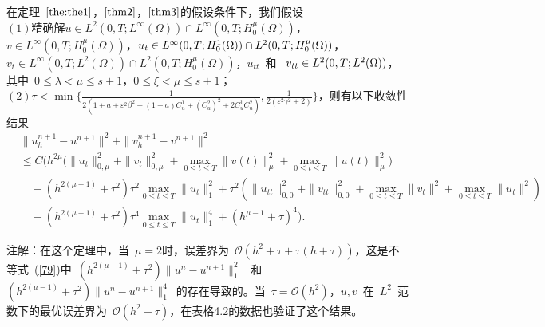 \documentclass[twoside,UTF8]{nputhesis}
\begin{document}
\begin{theorem}
	[收敛性~II]
	在定理~$\ref{the:the1}$，$\ref{thm2}$，$\ref{thm3}$的假设条件下，我们假设\\
	$(1)$\quad 精确解$u\in L^2(0,T;L^\infty(\Omega))\cap L^{\infty}(0,T;H^\mu_0(\Omega))$，$v\in L^{\infty}(0,T;H^\mu_0(\Omega))$，$u_t\in L^\infty(0,\\T;H^1_0(\Omega))\cap L^2(0,T;H^\mu_0(\Omega))$，$v_t\in L^\infty(0,T;L^2(\Omega))\cap L^2(0,T;H^\mu_0(\Omega))$，$u_{tt}$~和 ~$v_{tt}\in L^2(0,\\T;L^2(\Omega))$，其中~$0\leq\lambda<\mu\leq {s+1}$，$0\leq\xi<\mu\leq {s+1}$；\\
	$(2)$\quad $\tau<\min\{\frac{1}{2(1+a+\varepsilon^2\beta^2+(1+a)C_u^1+(C_u^2)^2+2C_u^1C_u^2)},\frac{1}{2(\varepsilon^2\gamma^2+2)}\}$，则有以下收敛性结果
	\begin{equation*}
	\begin{split}
	&\|u^{n+1}_h-u^{n+1}\|^2+\| v^{n+1}_h-v^{n+1}\|^2\\
	&\leq C\Big(h^{2\mu}\big( \| u_t\|^2_{0,\mu}+\| v_t\|^2_{0,\mu}+\max_{0\leq t\leq T}\| v(t)\|^2_\mu+\max_{0\leq t\leq T}\| u(t)\|^2_{\mu}\big)\\
	&\quad+(h^{2(\mu-1)}+\tau^2)\tau^2\max_{0\leq t\leq T}\| u_t\|^2_1+\tau^2(\| u_{tt}\|^2_{0,0}+\| v_{tt}\|^2_{0,0}+\max_{0\leq t\leq T}\| v_t\|^2+\max_{0\leq t\leq T}\| u_t\|^2)\\
	&\quad+(h^{2(\mu-1)}+\tau^2)\tau^4\max_{0\leq t\leq T}\| u_t\|^4_1+(h^{\mu-1}+\tau)^4\Big).
	\end{split}
	\label{ending}
	\end{equation*}
	\label{the:the3}
\end{theorem}
注解：在这个定理中，当~$\mu=2$时，误差界为~$\mathcal {O}(h^2+\tau+\tau(h+\tau))$，这是不等式~(\ref{79})中~$(h^{2(\mu-1)}\!+\!\tau^2)\parallel u^n-u^{n+1}\parallel^2_1$~ 和~$(h^{2(\mu-1)}\!+\!\tau^2)\parallel u^n-u^{n+1}\parallel^4_1$~的存在导致的。当~$\tau=\mathcal{O}(h^2)$，$u, v$~在~$L^2$~范数下的最优误差界为~$\mathcal {O}(h^2+\tau)$，在表格4.2的数据也验证了这个结果。
\end{document}
